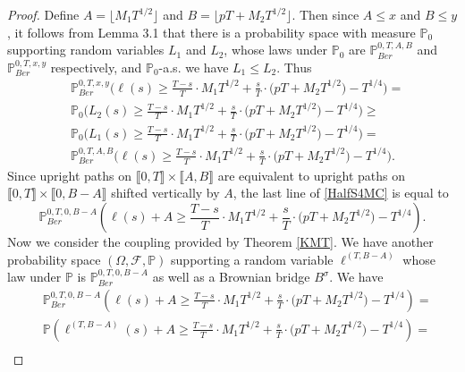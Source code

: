 \begin{proof}
	Define $A = \lfloor M_1T^{1/2}\rfloor$ and $B = \lfloor pT + M_2 T^{1/2}\rfloor$. Then since $A\leq x$ and $B\leq y$, it follows from Lemma 3.1 that there is a probability space with measure $\mathbb{P}_0$ supporting random variables $L_1$ and $L_2$, whose laws under $\mathbb{P}_0$ are $\mathbb{P}^{0,T,A,B}_{Ber}$ and $\mathbb{P}^{0,T,x,y}_{Ber}$ respectively, and $\mathbb{P}_0$-a.s. we have $L_1\leq L_2$. Thus
	\begin{equation}\label{HalfS4MC}
	\begin{split}
	&\mathbb{P}^{0,T,x,y}_{Ber}\Big( \ell(s)  \geq \frac{T-s}{T} \cdot M_1 T^{1/2} + \frac{s}{T} \cdot \big(p T + M_2 T^{1/2}\big) - T^{1/4} \Big) =\\
	& \mathbb{P}_0\Big( L_2(s)  \geq \frac{T-s}{T} \cdot M_1 T^{1/2} + \frac{s}{T} \cdot \big(p T + M_2 T^{1/2}\big) - T^{1/4} \Big) \geq\\
	&\mathbb{P}_0\Big( L_1(s)  \geq \frac{T-s}{T} \cdot M_1 T^{1/2} + \frac{s}{T} \cdot \big(p T + M_2 T^{1/2}\big) - T^{1/4} \Big) =\\
	&\mathbb{P}^{0,T,A,B}_{Ber}\Big( \ell(s)  \geq \frac{T-s}{T} \cdot M_1 T^{1/2} + \frac{s}{T} \cdot \big(p T + M_2 T^{1/2}\big) - T^{1/4} \Big).
	\end{split}
	\end{equation}
	Since upright paths on $\llbracket 0,T\rrbracket \times \llbracket A,B\rrbracket$ are equivalent to upright paths on $\llbracket 0,T\rrbracket \times \llbracket 0, B-A\rrbracket$ shifted vertically by $A$, the last line of \eqref{HalfS4MC} is equal to
	\[
	\mathbb{P}^{0,T,0,B-A}_{Ber}\left( \ell(s) + A  \geq \frac{T-s}{T} \cdot M_1 T^{1/2} + \frac{s}{T} \cdot \big(p T + M_2 T^{1/2}\big) - T^{1/4} \right).
	\]
	Now we consider the coupling provided by Theorem \ref{KMT}. We have another probability space $(\Omega,\mathcal{F},\mathbb{P})$ supporting a random variable $\ell^{(T,B-A)}$ whose law under $\mathbb{P}$ is $\mathbb{P}^{0,T,0,B-A}_{Ber}$ as well as a Brownian bridge $B^\sigma$. We have 
	\begin{equation}\label{HalfS4split}
	\begin{split}
	&\mathbb{P}^{0,T,0,B-A}_{Ber}\left( \ell(s) + A  \geq \frac{T-s}{T} \cdot M_1 T^{1/2} + \frac{s}{T} \cdot \big(p T + M_2 T^{1/2}\big) - T^{1/4} \right) =\\
	& \mathbb{P}\left( \ell^{(T,B-A)}(s) + A \geq \frac{T-s}{T} \cdot M_1 T^{1/2} + \frac{s}{T} \cdot \big(p T + M_2 T^{1/2}\big) - T^{1/4} \right) =\\

\end{split}
\end{equation}
\end{proof}
